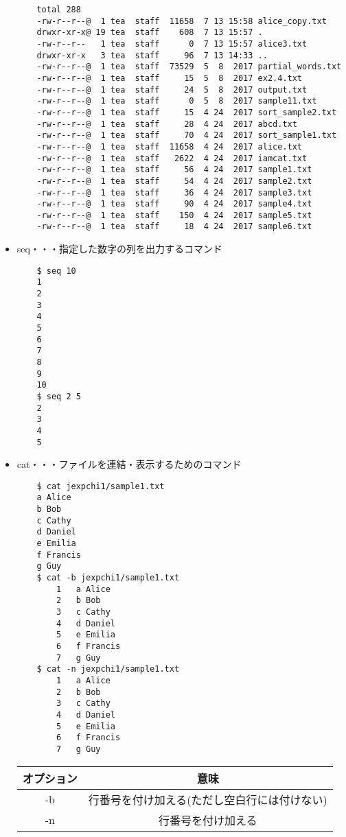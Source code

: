 \documentclass[a4paper,12pt]{jarticle}
\begin{document}
\begin{itemize}
\begin{lstlisting}
    total 288
    -rw-r--r--@  1 tea  staff  11658  7 13 15:58 alice_copy.txt
    drwxr-xr-x@ 19 tea  staff    608  7 13 15:57 .
    -rw-r--r--   1 tea  staff      0  7 13 15:57 alice3.txt
    drwxr-xr-x   3 tea  staff     96  7 13 14:33 ..
    -rw-r--r--@  1 tea  staff  73529  5  8  2017 partial_words.txt
    -rw-r--r--@  1 tea  staff     15  5  8  2017 ex2.4.txt
    -rw-r--r--@  1 tea  staff     24  5  8  2017 output.txt
    -rw-r--r--@  1 tea  staff      0  5  8  2017 sample11.txt
    -rw-r--r--@  1 tea  staff     15  4 24  2017 sort_sample2.txt
    -rw-r--r--@  1 tea  staff     28  4 24  2017 abcd.txt
    -rw-r--r--@  1 tea  staff     70  4 24  2017 sort_sample1.txt
    -rw-r--r--@  1 tea  staff  11658  4 24  2017 alice.txt
    -rw-r--r--@  1 tea  staff   2622  4 24  2017 iamcat.txt
    -rw-r--r--@  1 tea  staff     56  4 24  2017 sample1.txt
    -rw-r--r--@  1 tea  staff     54  4 24  2017 sample2.txt
    -rw-r--r--@  1 tea  staff     36  4 24  2017 sample3.txt
    -rw-r--r--@  1 tea  staff     90  4 24  2017 sample4.txt
    -rw-r--r--@  1 tea  staff    150  4 24  2017 sample5.txt
    -rw-r--r--@  1 tea  staff     18  4 24  2017 sample6.txt
                    \end{lstlisting}
          \clearpage
    \item seq・・・指定した数字の列を出力するコマンド
          \begin{lstlisting}
    $ seq 10
    1
    2
    3
    4
    5
    6
    7
    8
    9
    10
    $ seq 2 5
    2
    3
    4
    5
                    \end{lstlisting}
    \item cat・・・ファイルを連結・表示するためのコマンド
          \begin{lstlisting}
    $ cat jexpchi1/sample1.txt
    a Alice
    b Bob
    c Cathy
    d Daniel
    e Emilia
    f Francis
    g Guy
    $ cat -b jexpchi1/sample1.txt  
        1	a Alice
        2	b Bob
        3	c Cathy
        4	d Daniel
        5	e Emilia
        6	f Francis
        7	g Guy
    $ cat -n jexpchi1/sample1.txt  
        1	a Alice
        2	b Bob
        3	c Cathy
        4	d Daniel
        5	e Emilia
        6	f Francis
        7	g Guy
        \end{lstlisting}
          \begin{table}[h]
              \begin{center}
                  \begin{tabular}{|c|c|} \hline
                      オプション & 意味                                         \\ \hline
                      -b         & 行番号を付け加える(ただし空白行には付けない) \\ \hline
                      -n         & 行番号を付け加える                           \\ \hline
                  \end{tabular}
              \end{center}
          \end{table}


\end{itemize}
\end{document}
